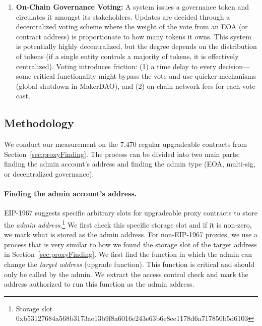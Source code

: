 \begin{enumerate}
\item \textbf{On-Chain Governance Voting:} A system issues a governance token and circulates it amongst its stakeholders. Updates are decided through a decentralized voting scheme where the weight of the vote from an EOA (or contract address) is proportionate to how many tokens it owns. This system is potentially highly decentralized, but the degree depends on the distribution of tokens (\eg if a single entity controls a majority of tokens, it is effectively centralized). Voting introduces friction: (1) a time delay to every decision---some critical functionality might bypass the vote and use quicker mechanisms (\eg global shutdown in MakerDAO), and (2) on-chain network fees for each vote cast.

\end{enumerate}

\subsection{Methodology}


We conduct our measurement on the 7,470 regular upgradeable contracts from Section~\ref{sec:proxyFinding}. The process can be divided into two main parts: finding the admin account's address and finding the admin type (EOA, multi-sig, or decentralized governance).

\paragraph{Finding the admin account's address.} EIP-1967 suggests specific arbitrary slots for upgradeable proxy contracts to store the \textit{admin address}.\footnote{Storage slot 0xb53127684a568b3173ae13b9f8a6016e243e63b6e8ee1178d6a717850b5d6103} We first check this specific storage slot and if it is non-zero, we mark what is stored as the admin address. 
For non-EIP-1967 proxies, we use a process that is very similar to how we found the storage slot of the target address in Section~\ref{sec:proxyFinding}. We first find the function in which the admin can change the \textit{target address} (upgrade function). This function is critical and should only be called by the admin. We extract the access control check and mark the address authorized to run this function as the admin address.

